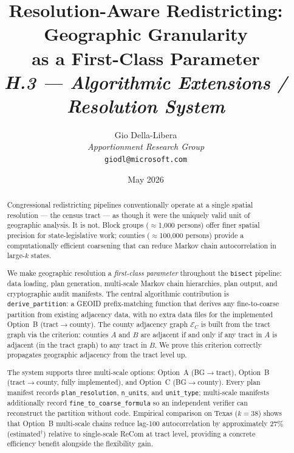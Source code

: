 \documentclass[12pt]{article}
\title{%
  \textbf{Resolution-Aware Redistricting: Geographic Granularity}\\
  \textbf{as a First-Class Parameter}\\[0.8em]
  \normalsize\textit{H.3 --- Algorithmic Extensions / Resolution System}%
}
\author{%
  Gio Della-Libera\\
  \textit{Apportionment Research Group}\\
  \small\texttt{giodl@microsoft.com}
}
\date{May 2026}
\newcommand{\redist}{\texttt{bisect}}
\newcommand{\derive}{\texttt{derive\_partition}}
\newcommand{\ec}{\ensuremath{\mathcal{E}_C}}   %
\begin{document}
\maketitle

\begin{abstract}
\noindent
Congressional redistricting pipelines conventionally operate at a single spatial
resolution --- the census tract --- as though it were the uniquely valid unit of
geographic analysis.
It is not.
Block groups ($\approx$1{,}000 persons) offer finer spatial precision for
state-legislative work; counties ($\approx$100{,}000 persons) provide a
computationally efficient coarsening that can reduce Markov chain autocorrelation
in large-$k$ states.

We make geographic resolution a \emph{first-class parameter} throughout the
\redist{} pipeline: data loading, plan generation, multi-scale Markov chain
hierarchies, plan output, and cryptographic audit manifests.
The central algorithmic contribution is \derive{}: a GEOID prefix-matching function
that derives any fine-to-coarse partition from existing adjacency data,
with no extra data files for the implemented Option~B (tract$\to$county).
The county adjacency graph $\ec$ is built from the tract graph via the
criterion: counties $A$ and $B$ are adjacent if and only if any tract in $A$
is adjacent (in the tract graph) to any tract in $B$.
We prove this criterion correctly propagates geographic adjacency from the
tract level up.

The system supports three multi-scale options:
Option~A (BG$\to$tract), Option~B (tract$\to$county, fully implemented),
and Option~C (BG$\to$county).
Every plan manifest records \texttt{plan\_resolution}, \texttt{n\_units},
and \texttt{unit\_type}; multi-scale manifests additionally record
\texttt{fine\_to\_coarse\_formula} so an independent verifier can reconstruct
the partition without code.
Empirical comparison on Texas ($k=38$) shows that Option~B multi-scale chains
reduce lag-100 autocorrelation by approximately 27\% (estimated$^\dagger$) relative
to single-scale ReCom at tract level,
providing a concrete efficiency benefit alongside the flexibility gain.
\end{abstract}

\tableofcontents
\newpage











\end{document}
